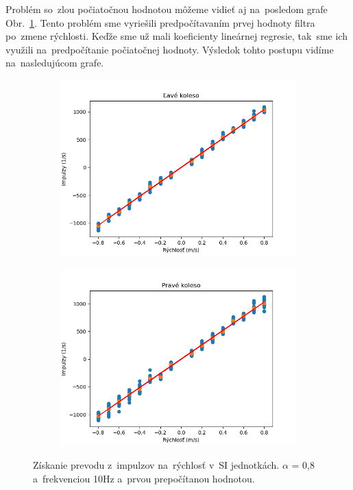 Problém so~zlou počiatočnou hodnotou môžeme vidieť aj na~posledom grafe Obr.~\ref{fig:rw_lw_08100_3}. Tento problém sme vyriešili
predpočítavaním prvej hodnoty filtra po~zmene rýchlosti. Keďže sme už mali koeficienty lineárnej regresie, tak~sme ich využili
na~predpočítanie počiatočnej hodnoty. Výsledok tohto postupu vidíme na~nasledujúcom grafe.

\begin{figure}[!htbp]
	\begin{subfigure}{0.5\textwidth}
		\includegraphics[width=\textwidth]{img/lw_08100_3.png}
	\end{subfigure}
	\hfill
	\begin{subfigure}{0.5\textwidth}
		\includegraphics[width=\textwidth]{img/rw_08100_3.png}
	\end{subfigure}
	\caption{Získanie prevodu z~impulzov na~rýchlosť v~SI jednotkách. $\alpha$ = 0,8 a~frekvenciou 10Hz a~prvou prepočítanou hodnotou.}
	\label{fig:rw_lw_08100_3}
\end{figure}

